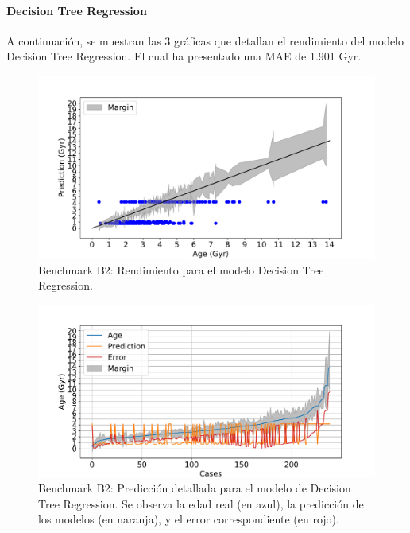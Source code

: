 \paragraph{Decision Tree Regression} 
A continuación, se muestran las 3 gráficas que detallan el rendimiento del modelo Decision Tree Regression. El cual ha presentado una MAE de 1.901 Gyr.
\begin{figure}[H]
\begin{center}
 \includegraphics[width=0.8\linewidth]{Figuras/Experimentos/B_B2_dtr_1.pdf}
\end{center}
\caption{Benchmark B2: Rendimiento para el modelo Decision Tree Regression.}
 \label{fig:benchB2_details_dtr_1}
\end{figure}

\begin{figure}[H]
\begin{center}
 \includegraphics[width=0.8\linewidth]{Figuras/Experimentos/B_B2_dtr_2.pdf}
\end{center}
\caption{Benchmark B2: Predicción detallada para el modelo de Decision Tree Regression. Se observa la edad real (en azul), la predicción de los modelos (en naranja), y el error correspondiente (en rojo).}
 \label{fig:benchB2_details_dtr_2}
\end{figure}

